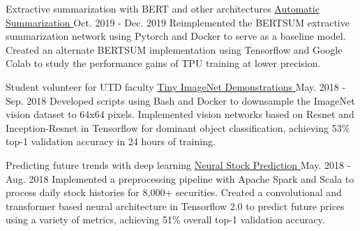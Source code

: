 

\begin{cventries}

  \cventry
  	{Extractive summarization with BERT and other architectures} %
		{
			\href{https://github.com/TidalPaladin/neural-summarizer}
			{Automatic Summarization \faGithubSquare}
		} %
  	{Oct. 2019 - Dec. 2019} %
    {} %
	{
		Reimplemented the BERTSUM extractive summarization network using
		Pytorch and Docker to serve as a baseline model. Created an
		alternate BERTSUM implementation using Tensorflow and Google Colab
		to study the performance gains of TPU training at lower precision.
	}

  \cventry
  	{Student volunteer for UTD faculty} %
		{
			\href{https://github.com/TidalPaladin/tiny-imagenet-demo}
			{Tiny ImageNet Demonstrations \faGithubSquare}
		} %
  	{May. 2018 - Sep. 2018} %
    {} %
	{
		Developed scripts using Bash and Docker to downsample
		the ImageNet vision dataset to 64x64 pixels.
		Implemented vision networks based on Resnet and
		Inception-Resnet in Tensorflow for dominant object
		classification, achieving 53\% top-1 validation accuracy
		in 24 hours of training.
	}

  \cventry
  	{Predicting future trends with deep learning} %
		{
			\href{https://github.com/TidalPaladin/trader}
			{Neural Stock Prediction \faGithubSquare}
		} %
  	{May. 2018 - Aug. 2018} %
    {} %
	{
		Implemented a preprocessing pipeline with Apache Spark and Scala
		to process daily stock histories for 8,000+ securities.
		Created a convolutional and transformer based neural architecture
		in Tensorflow 2.0 to predict future prices using a variety of
		metrics, achieving 51\% overall top-1 validation accuracy.
	}

\end{cventries}
